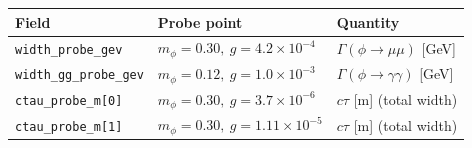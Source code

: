 \documentclass[11pt]{article}
\begin{document}
\begin{center}
\begin{tabular}{@{}lll@{}}
\toprule
Field & Probe point & Quantity \\
\midrule
\texttt{width\_probe\_gev} & $m_\phi=0.30,\ g=4.2\times10^{-4}$ & $\Gamma(\phi\to\mu\mu)$ [GeV] \\
\texttt{width\_gg\_probe\_gev} & $m_\phi=0.12,\ g=1.0\times10^{-3}$ & $\Gamma(\phi\to\gamma\gamma)$ [GeV] \\
\texttt{ctau\_probe\_m[0]} & $m_\phi=0.30,\ g=3.7\times10^{-6}$ & $c\tau$ [m] (total width) \\
\texttt{ctau\_probe\_m[1]} & $m_\phi=0.30,\ g=1.11\times10^{-5}$ & $c\tau$ [m] (total width) \\
\bottomrule
\end{tabular}
\end{center}
\end{document}
